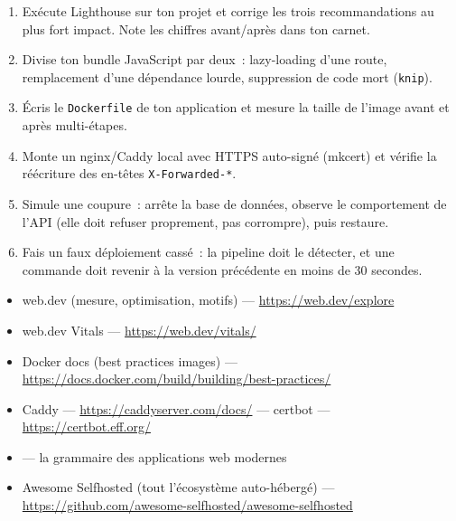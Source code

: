 \begin{exercice}
\begin{enumerate}
  \item Ex\'ecute Lighthouse sur ton projet et corrige les trois recommandations au plus fort
        impact. Note les chiffres avant/apr\`es dans ton carnet.
  \item Divise ton bundle JavaScript par deux~: lazy-loading d'une route, remplacement d'une
        d\'ependance lourde, suppression de code mort (\verb|knip|).
  \item \'Ecris le \verb|Dockerfile| de ton application et mesure la taille de l'image avant et
        apr\`es multi-\'etapes.
  \item Monte un nginx/Caddy local avec HTTPS auto-sign\'e (mkcert) et v\'erifie la r\'e\'ecriture
        des en-t\^etes \verb|X-Forwarded-*|.
  \item Simule une coupure~: arr\^ete la base de donn\'ees, observe le comportement de l'API
        (elle doit refuser proprement, pas corrompre), puis restaure.
  \item Fais un faux d\'eploiement cass\'e~: la pipeline doit le d\'etecter, et une commande doit
        revenir \`a la version pr\'ec\'edente en moins de 30 secondes.
\end{enumerate}
\end{exercice}

\begin{ressources}
\begin{itemize}
  \item web.dev (mesure, optimisation, motifs) --- \url{https://web.dev/explore}
  \item web.dev Vitals --- \url{https://web.dev/vitals/}
  \item Docker docs (best practices images) --- \url{https://docs.docker.com/build/building/best-practices/}
  \item Caddy --- \url{https://caddyserver.com/docs/} --- certbot --- \url{https://certbot.eff.org/}
  \item {} --- la grammaire des applications web modernes
  \item Awesome Selfhosted (tout l'\'ecosyst\`eme auto-h\'eberg\'e) --- \url{https://github.com/awesome-selfhosted/awesome-selfhosted}
\end{itemize}
\end{ressources}

